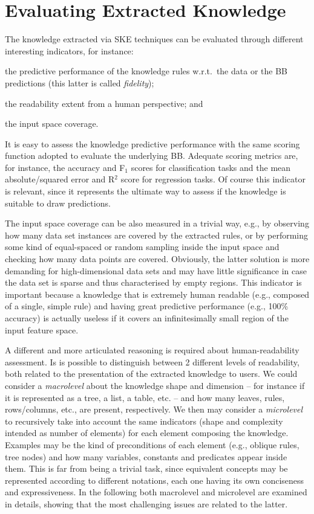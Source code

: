\documentclass[sigconf]{acmart}
\begin{document}
\section{Evaluating Extracted Knowledge}

The knowledge extracted via SKE techniques can be evaluated through different interesting indicators, for instance:
%
\begin{inlinelist}
	\item the predictive performance of the knowledge rules w.r.t.\ the data or the BB predictions (this latter is called \emph{fidelity});
	\item the readability extent from a human perspective; and
	\item the input space coverage.
\end{inlinelist}

It is easy to assess the knowledge predictive performance with the same scoring function adopted to evaluate the underlying BB.
%
Adequate scoring metrics are, for instance, the accuracy and F$_1$ scores for classification tasks and the mean absolute/squared error and R$^2$ score for regression tasks.
%
Of course this indicator is relevant, since it represents the ultimate way to assess if the knowledge is suitable to draw predictions.

The input space coverage can be also measured in a trivial way, e.g., by observing how many data set instances are covered by the extracted rules, or by performing some kind of equal-spaced or random sampling inside the input space and checking how many data points are covered.
%
Obviously, the latter solution is more demanding for high-dimensional data sets and may have little significance in case the data set is sparse and thus characterised by empty regions.
%
This indicator is important because a knowledge that is extremely human readable (e.g., composed of a single, simple rule) and having great predictive performance (e.g., 100\% accuracy) is actually useless if it covers an infinitesimally small region of the input feature space.

A different and more articulated reasoning is required about human-readability assessment.
%
Is is possible to distinguish between 2 different levels of readability, both related to the presentation of the extracted knowledge to users.
%
We could consider a \emph{macrolevel} about the knowledge shape and dimension -- for instance if it is represented as a tree, a list, a table, etc. -- and how many leaves, rules, rows/columns, etc., are present, respectively.
%
We then may consider a \emph{microlevel} to recursively take into account the same indicators (shape and complexity intended as number of elements) for each element composing the knowledge.
%
Examples may be the kind of preconditions of each element (e.g., oblique rules, \mofn{} tree nodes) and how many variables, constants and predicates appear inside them.
%
This is far from being a trivial task, since equivalent concepts may be represented according to different notations, each one having its own conciseness and expressiveness.
%
In the following both macrolevel and microlevel are examined in details, showing that the most challenging issues are related to the latter.
\end{document}
